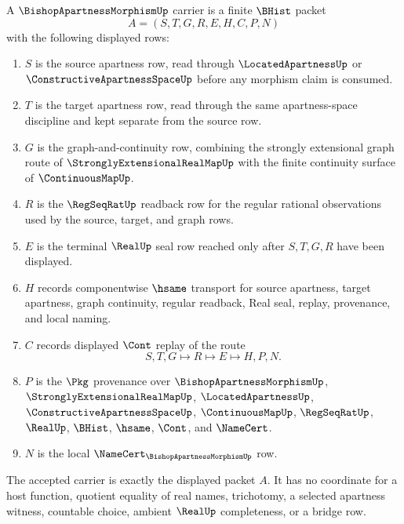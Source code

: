 \begin{definition}
\label{def:bishop-apartness-morphism-carrier}
A $\BishopApartnessMorphismUp$ carrier is a finite $\BHist$ packet
$$
A=(S,T,G,R,E,H,C,P,N)
$$
with the following displayed rows:
\begin{enumerate}
\item $S$ is the source apartness row, read through $\LocatedApartnessUp$ or $\ConstructiveApartnessSpaceUp$ before any morphism claim is consumed.
\item $T$ is the target apartness row, read through the same apartness-space discipline and kept separate from the source row.
\item $G$ is the graph-and-continuity row, combining the strongly extensional graph route of $\StronglyExtensionalRealMapUp$ with the finite continuity surface of $\ContinuousMapUp$.
\item $R$ is the $\RegSeqRatUp$ readback row for the regular rational observations used by the source, target, and graph rows.
\item $E$ is the terminal $\RealUp$ seal row reached only after $S,T,G,R$ have been displayed.
\item $H$ records componentwise $\hsame$ transport for source apartness, target apartness, graph continuity, regular readback, Real seal, replay, provenance, and local naming.
\item $C$ records displayed $\Cont$ replay of the route
$$
S,T,G \longmapsto R \longmapsto E \longmapsto H,P,N .
$$
\item $P$ is the $\Pkg$ provenance over $\BishopApartnessMorphismUp$, $\StronglyExtensionalRealMapUp$, $\LocatedApartnessUp$, $\ConstructiveApartnessSpaceUp$, $\ContinuousMapUp$, $\RegSeqRatUp$, $\RealUp$, $\BHist$, $\hsame$, $\Cont$, and $\NameCert$.
\item $N$ is the local $\NameCert_{\BishopApartnessMorphismUp}$ row.
\end{enumerate}
The accepted carrier is exactly the displayed packet $A$. It has no coordinate for a host function, quotient equality of real names, trichotomy, a selected apartness witness, countable choice, ambient $\RealUp$ completeness, or a bridge row.
\end{definition}

